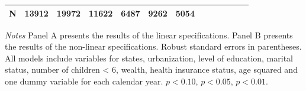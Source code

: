 \documentclass[12pt,english]{article}
\begin{document}
\begin{table}[!ht]
\begin{center}
\begin{adjustbox}{max width=.9\linewidth}
\begin{threeparttable}
{\begin{tabular}{l*{6}{S S}}
						\midrule
					N         &    13912         &    19972         &    11622         &     6487         &     9262         &     5054         \\
						\bottomrule
					\end{tabular}
					\begin{tablenotes}
						\item \footnotesize \textit{Notes} Panel A presents the results of the linear specifications. Panel B presents the results of the non-linear specifications. Robust standard errors in parentheses. All models include variables for  states, urbanization, level of education, marital status, number of children < 6, wealth, health insurance status, age squared and one dummy variable for each calendar year. \sym{*} \(p<0.10\), \sym{**} \(p<0.05\), \sym{***} \(p<0.01\).
					\end{tablenotes}
				}
			\end{threeparttable}
		\end{adjustbox}
	\end{center}
\end{table}
\end{document}
